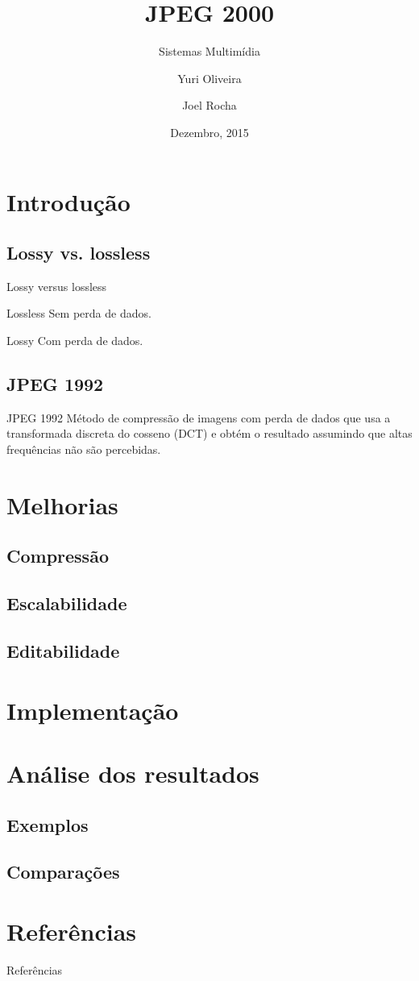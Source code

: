 \documentclass{beamer}
\title{JPEG 2000}
\subtitle{Sistemas Multimídia}
\author[Yuri, Joel]{Yuri Oliveira \and Joel Rocha}
\institute[IFCE]{Instituto Federal de Ciência, Arte e Tecnologia}
\date{Dezembro, 2015}
\begin{document}
\begin{frame}
\titlepage
\end{frame}
\begin{frame}{\contentsname}
\tableofcontents
\end{frame}
\section{Introdução}
\subsection{Lossy vs. lossless}
\begin{frame}{Lossy versus lossless}
   \begin{block}{Lossless}
      Sem perda de dados.
   \end{block}
   \begin{block}{Lossy}
      Com perda de dados.
   \end{block}
\end{frame}
\subsection{JPEG 1992}
\begin{frame}{JPEG 1992}
   Método de compressão de imagens com perda de dados que usa a transformada discreta do cosseno (DCT) e obtém o resultado assumindo que altas frequências não são percebidas.
\end{frame}

\section{Melhorias}
\subsection{Compressão}
\subsection{Escalabilidade}
\subsection{Editabilidade}
\section{Implementação}
\section{Análise dos resultados}
\subsection{Exemplos}
\subsection{Comparações}
\section{Referências}
\begin{frame}{Referências}

\end{frame}
\end{document}
